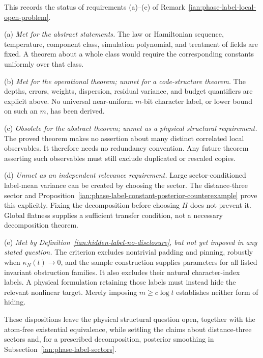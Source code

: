 \begin{remark}
\label{ian:hidden-label-requirements-disposition}
This records the status of requirements (a)--(e) of Remark~\ref{ian:phase-label-local-open-problem}.

\medskip\noindent
(a) \emph{Met for the abstract statements.}
The law or Hamiltonian sequence, temperature, component class, simulation polynomial, and treatment of fields are fixed. A theorem about a whole class would require the corresponding constants uniformly over that class.

\medskip\noindent
(b) \emph{Met for the operational theorem; unmet for a code-structure theorem.}
The depths, errors, weights, dispersion, residual variance, and budget quantifiers are explicit above. No universal near-uniform \(m\)-bit character label, or lower bound on such an \(m\), has been derived.

\medskip\noindent
(c) \emph{Obsolete for the abstract theorem; unmet as a physical structural requirement.}
The proved theorem makes no assertion about many distinct correlated local observables. It therefore needs no redundancy convention. Any future theorem asserting such observables must still exclude duplicated or rescaled copies.

\medskip\noindent
(d) \emph{Unmet as an independent relevance requirement.}
Large sector-conditioned label-mean variance can be created by choosing the sector. The distance-three sector and
Proposition~\ref{ian:phase-label-constant-posterior-counterexample}
prove this explicitly. Fixing the decomposition before choosing \(H\) does not prevent it. Global flatness supplies a sufficient transfer condition, not a necessary decomposition theorem.

\medskip\noindent
(e) \emph{Met by Definition~\ref{ian:hidden-label-no-disclosure}, but not yet imposed in any stated question.}
The criterion excludes nontrivial padding and pinning, robustly when \(\kappa_N(t)\to0\), and the sample construction supplies parameters for all listed invariant obstruction families. It also excludes their natural character-index labels. A physical formulation retaining those labels must instead hide the relevant nonlinear target. Merely imposing \(m\ge c\log t\) establishes neither form of hiding.

These dispositions leave the physical structural question open, together with the atom-free existential equivalence, while settling the claims about distance-three sectors and, for a prescribed decomposition, posterior smoothing in Subsection~\ref{ian:phase-label-sectors}.
\end{remark}

